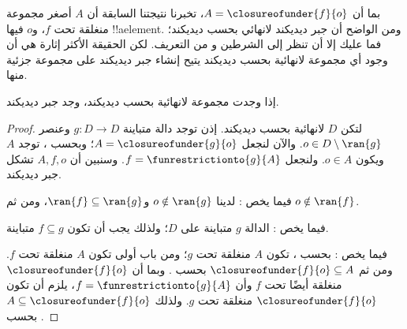\documentclass[../../../include/open-logic-section]{subfiles}
\begin{document}
بما أن $A = \closureofunder{f}{o}$، تخبرنا نتيجتنا السابقة أن $A$ أصغر
مجموعة منغلقة تحت $f$، و$o$ فيها !!a{element}. ومن الواضح أن جبر
ديديكند لانهائي بحسب ديديكند؛ فما عليك إلا أن تنظر إلى الشرطين
 و من التعريف. لكن الحقيقة الأكثر
إثارة هي أن وجود أي مجموعة لانهائية بحسب ديديكند يتيح إنشاء جبر
ديديكند على مجموعة جزئية منها.

\begin{thm}
إذا وجدت مجموعة لانهائية بحسب ديديكند، وجد جبر ديديكند.
\end{thm}

\begin{proof}
لتكن $D$ لانهائية بحسب ديديكند. إذن توجد دالة متباينة $g \colon D \to
D$ وعنصر $o  \in D \setminus \ran{g}$. والآن لنجعل $A =
\closureofunder{g}{o}$؛ وبحسب ، توجد $A$ ويكون
$o \in A$. ولنجعل $f =
\funrestrictionto{g}{A}$. وسنبين أن $A, f, o$ تشكل جبر ديديكند.

فيما يخص : لدينا $o \notin \ran{g}$ و$\ran{f}
\subseteq \ran{g}$، ومن ثم $o\notin \ran{f}$.

فيما يخص : الدالة $g$ متباينة على $D$؛ ولذلك يجب
أن تكون $f \subseteq g$ متباينة.

فيما يخص : بحسب ، تكون $A$
منغلقة تحت $g$؛ ومن باب أولى تكون $A$ منغلقة تحت $f$. ومن ثم
$\closureofunder{f}{o} \subseteq A$ بحسب .
وبما أن $\closureofunder{f}{o}$ منغلقة أيضًا تحت $f$ وأن $f =
\funrestrictionto{g}{A}$، يلزم أن تكون $\closureofunder{f}{o}$ منغلقة
تحت $g$. ولذلك $A \subseteq \closureofunder{f}{o}$ بحسب
.
\end{proof}
\end{document}
